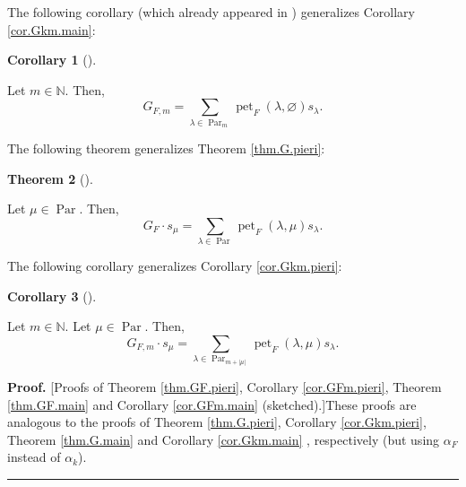 \documentclass[numbers=enddot,12pt,final,onecolumn,notitlepage]{scrartcl}%
\theoremstyle{definition}
\newtheorem{theo}{Theorem}[section]
\newenvironment{theorem}[1][]
{\begin{theo}[#1]\begin{leftbar}}
{\end{leftbar}\end{theo}}
\newtheorem{coro}[theo]{Corollary}
\newenvironment{corollary}[1][]
{\begin{coro}[#1]\begin{leftbar}}
{\end{leftbar}\end{coro}}
\newenvironment{proof}[1][Proof]{\noindent\textbf{#1.} }{\ \rule{0.5em}{0.5em}}
\let\sumnonlimits\sum
\renewcommand{\sum}{\sumnonlimits\limits}
\newenvironment{vershort}{}{}
\begin{document}
The following corollary (which already appeared in \cite[Exercise 7.91
(d)]{Stanley-EC2}) generalizes Corollary \ref{cor.Gkm.main}:

\begin{corollary}
\label{cor.GFm.main}Let $m\in\mathbb{N}$. Then,%
\[
G_{F,m}=\sum_{\lambda\in\operatorname*{Par}\nolimits_{m}}\operatorname*{pet}%
\nolimits_{F}\left(  \lambda,\varnothing\right)  s_{\lambda}.
\]

\end{corollary}

The following theorem generalizes Theorem \ref{thm.G.pieri}:

\begin{theorem}
\label{thm.GF.pieri}Let $\mu\in\operatorname*{Par}$. Then,%
\[
G_{F}\cdot s_{\mu}=\sum_{\lambda\in\operatorname*{Par}}\operatorname*{pet}%
\nolimits_{F}\left(  \lambda,\mu\right)  s_{\lambda}.
\]

\end{theorem}

The following corollary generalizes Corollary \ref{cor.Gkm.pieri}:

\begin{corollary}
\label{cor.GFm.pieri}Let $m\in\mathbb{N}$. Let $\mu\in\operatorname*{Par}$.
Then,%
\[
G_{F,m}\cdot s_{\mu}=\sum_{\lambda\in\operatorname*{Par}%
\nolimits_{m+\left\vert \mu\right\vert }}\operatorname*{pet}\nolimits_{F}%
\left(  \lambda,\mu\right)  s_{\lambda}.
\]

\end{corollary}

\begin{vershort}
\begin{proof}
[Proofs of Theorem \ref{thm.GF.pieri}, Corollary \ref{cor.GFm.pieri}, Theorem
\ref{thm.GF.main} and Corollary \ref{cor.GFm.main} (sketched).]These proofs
are analogous to the proofs of Theorem \ref{thm.G.pieri}, Corollary
\ref{cor.Gkm.pieri}, Theorem \ref{thm.G.main} and Corollary \ref{cor.Gkm.main}%
, respectively (but using $\alpha_{F}$ instead of $\alpha_{k}$).
\end{proof}
\end{vershort}
\end{document}
